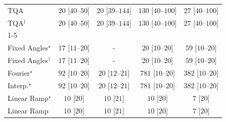 \begin{tabular}{l|cccc|}
TQA & {\cellcolor[HTML]{F5FBF2}} \color[HTML]{000000} $20$ [$40$--$50$] & {\cellcolor[HTML]{F5FBF2}} \color[HTML]{000000} $20$ [$39$--$144$] & {\cellcolor[HTML]{DDF2D8}} \color[HTML]{000000} $130$ [$40$--$100$] & {\cellcolor[HTML]{F4FBF1}} \color[HTML]{000000} $27$ [$40$--$100$] \\
TQA$^\dagger$ & {\cellcolor[HTML]{F5FBF2}} \color[HTML]{000000} $20$ [$40$--$50$] & {\cellcolor[HTML]{F5FBF2}} \color[HTML]{000000} $20$ [$39$--$144$] & {\cellcolor[HTML]{DDF2D8}} \color[HTML]{000000} $130$ [$40$--$100$] & {\cellcolor[HTML]{F4FBF1}} \color[HTML]{000000} $27$ [$40$--$100$] \\
\cline{1-5}
\multicolumn{5}{c}{\rule{0pt}{8pt}SV} \\
\midrule
Fixed Angles$^\star$ & {\cellcolor[HTML]{F5FBF3}} \color[HTML]{000000} $17$ [$11$--$20$] & {\cellcolor[HTML]{000000}} \color[HTML]{F1F1F1} {\cellcolor{white}} \color{black} - & {\cellcolor[HTML]{F5FBF2}} \color[HTML]{000000} $20$ [$10$--$20$] & {\cellcolor[HTML]{EDF8EA}} \color[HTML]{000000} $59$ [$10$--$20$] \\
Fixed Angles$^\dagger$ & {\cellcolor[HTML]{F5FBF3}} \color[HTML]{000000} $17$ [$11$--$20$] & {\cellcolor[HTML]{000000}} \color[HTML]{F1F1F1} {\cellcolor{white}} \color{black} - & {\cellcolor[HTML]{F5FBF2}} \color[HTML]{000000} $20$ [$10$--$20$] & {\cellcolor[HTML]{EDF8EA}} \color[HTML]{000000} $59$ [$10$--$20$] \\
Fourier$^\star$ & {\cellcolor[HTML]{E7F6E3}} \color[HTML]{000000} $92$ [$10$--$20$] & {\cellcolor[HTML]{F5FBF2}} \color[HTML]{000000} $20$ [$12$--$21$] & {\cellcolor[HTML]{00441B}} \color[HTML]{F1F1F1} $781$ [$10$--$20$] & {\cellcolor[HTML]{79C67A}} \color[HTML]{000000} $382$ [$10$--$20$] \\
Interp.$^\star$ & {\cellcolor[HTML]{E7F6E3}} \color[HTML]{000000} $92$ [$10$--$20$] & {\cellcolor[HTML]{F5FBF2}} \color[HTML]{000000} $20$ [$12$--$21$] & {\cellcolor[HTML]{00441B}} \color[HTML]{F1F1F1} $781$ [$10$--$20$] & {\cellcolor[HTML]{79C67A}} \color[HTML]{000000} $382$ [$10$--$20$] \\
Linear Ramp$^\star$ & {\cellcolor[HTML]{F7FCF5}} \color[HTML]{000000} $10$ [$20$] & {\cellcolor[HTML]{F7FCF5}} \color[HTML]{000000} $10$ [$21$] & {\cellcolor[HTML]{F7FCF5}} \color[HTML]{000000} $10$ [$20$] & {\cellcolor[HTML]{F7FCF5}} \color[HTML]{000000} $7$ [$20$] \\
Linear Ramp & {\cellcolor[HTML]{F7FCF5}} \color[HTML]{000000} $10$ [$20$] & {\cellcolor[HTML]{F7FCF5}} \color[HTML]{000000} $10$ [$21$] & {\cellcolor[HTML]{F7FCF5}} \color[HTML]{000000} $10$ [$20$] & {\cellcolor[HTML]{F7FCF5}} \color[HTML]{000000} $7$ [$20$] \\

\end{tabular}
